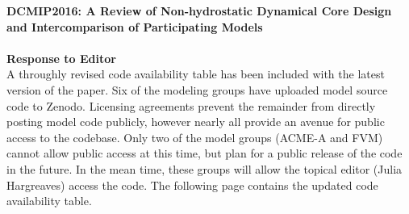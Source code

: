 \documentclass[11pt]{article}
\begin{document}
\noindent \textbf{DCMIP2016:  A Review of Non-hydrostatic Dynamical Core Design and Intercomparison of Participating Models} \\

 \\

\noindent \textbf{Response to Editor} \\

\noindent A throughly revised code availability table has been included with the latest version of the paper.  Six of the modeling groups have uploaded model source code to Zenodo.  Licensing agreements prevent the remainder from directly posting model code publicly, however nearly all provide an avenue for public access to the codebase.  Only two of the model groups (ACME-A and FVM) cannot allow public access at this time, but plan for a public release of the code in the future.  In the mean time, these groups will allow the topical editor (Julia Hargreaves) access the code.  The following page contains the updated code availability table.
\end{document}
